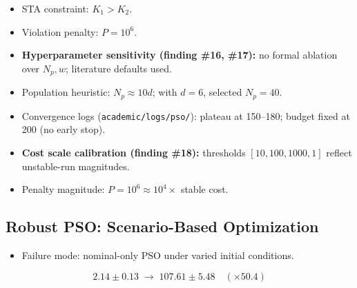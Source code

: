 \documentclass[10pt, a4paper]{article}
\begin{document}
\begin{center}
\end{center}

\begin{itemize}[leftmargin=1.5em,itemsep=0.2em]
  \item STA constraint: $K_1 > K_2$.
  \item Violation penalty: $P = 10^6$.
  \item \textbf{Hyperparameter sensitivity (finding \#16, \#17):}
  no formal ablation over $N_p,w$; literature defaults used.
  \item Population heuristic: $N_p \approx 10d$; with $d=6$, selected $N_p=40$.
  \item Convergence logs (\texttt{academic/logs/pso/}): plateau at 150--180;
  budget fixed at 200 (no early stop).
  \item \textbf{Cost scale calibration (finding \#18):}
  thresholds $[10,100,1000,1]$ reflect unstable-run magnitudes.
  \item Penalty magnitude: $P=10^6 \approx 10^4\times$ stable cost.
\end{itemize}

\subsection{Robust PSO: Scenario-Based Optimization}
\label{sec:robustpso}

\begin{itemize}[leftmargin=1.5em,itemsep=0.2em]
  \item Failure mode: nominal-only PSO under varied initial conditions.
\end{itemize}
\begin{equation}
  2.14 \pm 0.13
  \;\longrightarrow\;
  107.61 \pm 5.48
  \quad (\times 50.4)
\end{equation}
\end{document}
